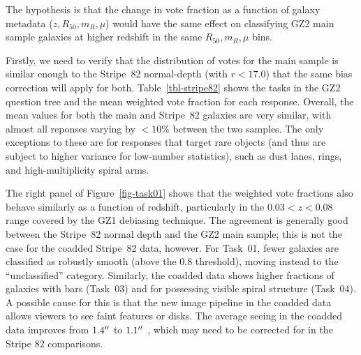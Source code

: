 \documentclass[useAMS,usenatbib]{mn2e}
\begin{document}
The hypothesis is that the change in vote fraction as a function of galaxy metadata ($z, R_{50}, m_R, \mu$) would have the same effect on classifying GZ2 main sample galaxies at higher redshift in the same $R_{50}, m_R, \mu$ bins. 

Firstly, we need to verify that the distribution of votes for the main sample is similar enough to the Stripe~82 normal-depth (with $r<17.0$) that the same bias correction will apply for both. Table~\ref{tbl-stripe82} shows the tasks in the GZ2 question tree and the mean weighted vote fraction for each response. Overall, the mean values for both the main and Stripe~82 galaxies are very similar, with almost all reponses varying by $<10\%$ between the two samples. The only exceptions to these are for responses that target rare objects (and thus are subject to higher variance for low-number statistics), such as dust lanes, rings, and high-multiplicity spiral arms. 

The right panel of Figure~\ref{fig-task01} shows that the weighted vote fractions also behave similarly as a function of redshift, particularly in the $0.03<z<0.08$ range covered by the GZ1 debiasing technique. The agreement is generally good between the Stripe~82 normal depth and the GZ2 main sample; this is not the case for the coadded Stripe~82 data, however. For Task~01, fewer galaxies are classified as robustly smooth (above the 0.8 threshold), moving instead to the ``unclassified'' category. Similarly, the coadded data shows higher fractions of galaxies with bars (Task~03) and for possessing visible spiral structure (Task~04). A possible cause for this is that the new image pipeline in the coadded data allows viewers to see faint features or disks. The average seeing in the coadded data improves from $1.4\hbox{$^{\prime\prime}$}$ to $1.1\hbox{$^{\prime\prime}$}$ \citep{ann11}, which may need to be corrected for in the Stripe 82 comparisons. 
\end{document}
